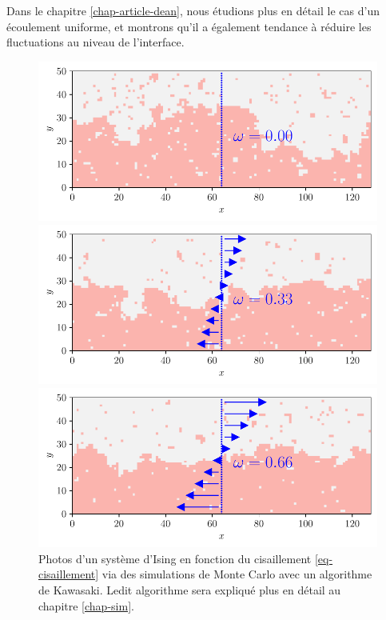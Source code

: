 Dans le chapitre \ref{chap-article-dean}, nous étudions plus en détail le cas d'un écoulement uniforme, et montrons qu'il a également tendance à réduire les fluctuations au niveau de l'interface.
\begin{figure}
	\begin{minipage}[t]{0.5\linewidth}
		\includegraphics[width=\linewidth]{intro/cis-ising-f-000.pdf}
	\end{minipage}%
	\begin{minipage}[t]{0.5\linewidth}
		\includegraphics[width=\linewidth]{intro/cis-ising-f-033.pdf}
	\end{minipage}
	\centering
	\begin{minipage}[t]{0.5\linewidth}
		\includegraphics[width=\linewidth]{intro/cis-ising-f-066.pdf}
	\end{minipage}
	\caption{Photos d'un système d'Ising en fonction du cisaillement  \ref{eq-cisaillement} via des simulations de Monte Carlo avec un algorithme de Kawasaki. Ledit algorithme sera expliqué plus en détail au chapitre \ref{chap-sim}.}
    \label{snap-ising-shear}	
\end{figure}  


